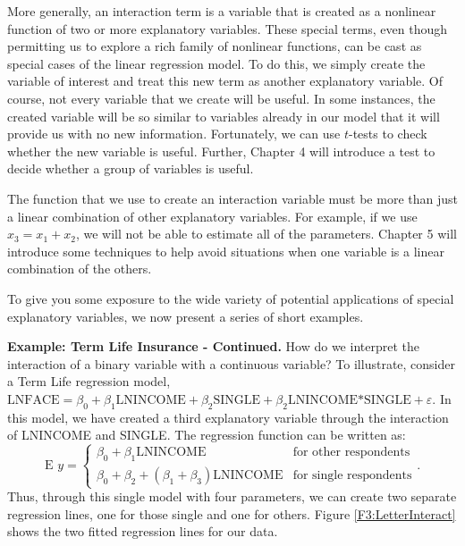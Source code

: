 More generally, an interaction term is a variable that is created as
a nonlinear function of two or more explanatory variables. These
special terms, even though permitting us to explore a rich family of
nonlinear functions, can be cast as special cases of the linear
regression model. To do this, we simply create the variable of
interest and treat this new term as another explanatory variable. Of
course, not every variable that we create will be useful. In some
instances, the created variable will be so similar to variables
already in our model that it will provide us with no new
information. Fortunately, we can use $t$-tests to check whether the
new variable is useful. Further, Chapter 4 will introduce a test to
decide whether a group of variables is useful.

The function that we use to create an interaction variable must be
more than just a linear combination of other explanatory variables.
For example, if we use $x_3 = x_1 + x_2$, we will not be able to
estimate all of the parameters. Chapter 5 will introduce some
techniques to help avoid situations when one variable is a linear
combination of the others.

To give you some exposure to the wide variety of potential
applications of special explanatory variables, we now present a
series of short examples.

\bigskip

\linejed

\textbf{Example: Term Life Insurance - Continued.} How do we
interpret the interaction of a binary variable with a continuous
variable? To illustrate, consider a Term Life regression model,
$\textrm{LNFACE} = \beta_0 + \beta_1 \textrm{LNINCOME} + \beta_2
\textrm{SINGLE} + \beta_2 \textrm{LNINCOME*SINGLE} + \varepsilon$.
In this model, we have created a third explanatory variable through
the interaction of LNINCOME and SINGLE. The regression function can
be written as:
\begin{equation*}
\textrm{E }y = \left\{ \begin{array}{ll}
        \beta_0 + \beta_1  \textrm{LNINCOME}           & \textrm{for other respondents} \\
        \beta_0 + \beta_2 + (\beta_1 + \beta_3)  \textrm{LNINCOME} & \textrm{for single respondents}
\end{array} \right. .
\end{equation*}
Thus, through this single model with four parameters, we can create
two separate regression lines, one for those single and one for
others. Figure \ref{F3:LetterInteract} shows the two fitted
regression lines for our data.


